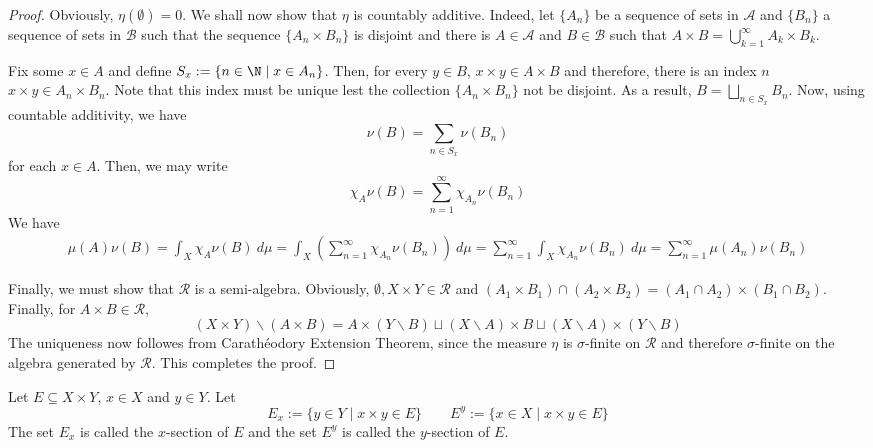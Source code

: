 \begin{proof}
    Obviously, $\eta(\emptyset) = 0$. We shall now show that $\eta$ is countably additive. Indeed, let $\{A_n\}$ be a sequence of sets in $\mathscr A$ and $\{B_n\}$ a sequence of sets in $\mathscr B$ such that the sequence $\{A_n\times B_n\}$ is disjoint and there is $A\in\mathscr A$ and $B\in\mathscr B$ such that $A\times B = \bigcup\limits_{k = 1}^\infty A_k\times B_k$. 

    Fix some $x\in A$ and define $S_x := \{n\in\N\mid x\in A_n\}$. Then, for every $y\in B$, $x\times y\in A\times B$ and therefore, there is an index $n$ $x\times y\in A_n\times B_n$. Note that this index must be unique lest the collection $\{A_n\times B_n\}$ not be disjoint. As a result, $B = \bigsqcup_{n\in S_x} B_n$. Now, using countable additivity, we have 
    \begin{equation*}
        \nu(B) = \sum_{n\in S_x}\nu(B_n)
    \end{equation*}
    for each $x\in A$. Then, we may write
    \begin{equation*}
        \chi_A\nu(B) = \sum_{n = 1}^\infty\chi_{A_n}\nu(B_n)
    \end{equation*}
    We have 
    \begin{align*}
        \mu(A)\nu(B) = \int_X\chi_A\nu(B)~d\mu = \int_X\left(\sum_{n = 1}^\infty\chi_{A_n}\nu(B_n)\right)~d\mu = \sum_{n = 1}^\infty\int_X\chi_{A_n}\nu(B_n)~d\mu = \sum_{n = 1}^\infty\mu(A_n)\nu(B_n)
    \end{align*}

    Finally, we must show that $\mathcal R$ is a semi-algebra. Obviously, $\emptyset, X\times Y\in\mathcal R$ and $(A_1\times B_1)\cap(A_2\times B_2) = (A_1\cap A_2)\times(B_1\cap B_2)$. Finally, for $A\times B\in\mathcal R$, 
    \begin{equation*}
        (X\times Y)\backslash(A\times B) = A\times(Y\backslash B)\sqcup(X\backslash A)\times B\sqcup(X\backslash A)\times(Y\backslash B)
    \end{equation*}
    The uniqueness now followes from Carath\'eodory Extension Theorem, since the measure $\eta$ is $\sigma$-finite on $\mathcal R$ and therefore $\sigma$-finite on the algebra generated by $\mathcal R$. This completes the proof.
\end{proof}

\begin{definition}
    Let $E\subseteq X\times Y$, $x\in X$ and $y\in Y$. Let 
    \begin{equation*}
        E_x := \{y\in Y\mid x\times y\in E\}\qquad E^y := \{x\in X\mid x\times y\in E\}
    \end{equation*}
    The set $E_x$ is called the $x$-section of $E$ and the set $E^y$ is called the $y$-section of $E$.
\end{definition}

